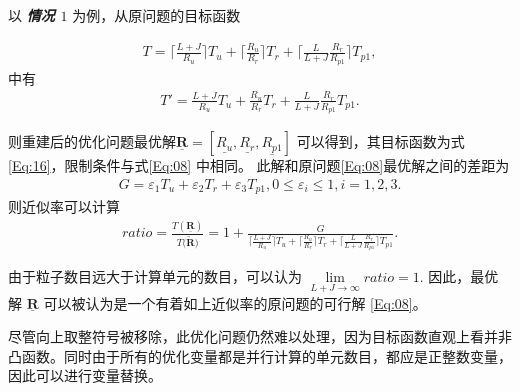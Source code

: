 以 \emph{\textbf{情况 $1$}} 为例，从原问题的目标函数

\begin{equation}\label{Eq:17}
\begin{split}
T=\lceil\frac{L+J}{R_{u}}\rceil T_{u}+\lceil\frac{R_{u}}{R_{r}}\rceil T_{r}+\lceil\frac{L}{L+J}\frac{R_r}{R_{p1}}\rceil T_{p1},
\end{split}
\end{equation}
中有
\begin{equation}\label{Eq:16}
\begin{split}
T'=\frac{L+J}{R_{u}} T_{u}+\frac{R_{u}}{R_{r}} T_{r}+\frac{L}{L+J}\frac{R_r}{R_{p1}} T_{p1}.
\end{split}
\end{equation}

则重建后的优化问题最优解$\mathbf{\underline{R}}=[\underline {R_{u}},\underline {R_{r}},\underline {R_{p1}}]$ 可以得到，其目标函数为式\eqref{Eq:16}，限制条件与式\eqref{Eq:08} 中相同。 此解和原问题\eqref{Eq:08}最优解之间的差距为
\begin{equation}\label{Eq:155}
\begin{split}
G = \varepsilon_1T_u+\varepsilon_2T_r+\varepsilon_3T_{p1}, 0\leq \varepsilon_i \leq 1, i=1,2,3.
\end{split}
\end{equation}
则近似率可以计算
\begin{equation}
\begin{split}
ratio = \frac{T(\mathbf{\underline{R}})}{T(\mathbf{\tilde {R})}} = 1+\frac{G}{\lceil\frac{L+J}{R_{u}}\rceil T_{u}+\lceil\frac{R_{u}}{R_{r}}\rceil T_{r}+\lceil\frac{L}{L+J}\frac{R_r}{R_{p1}}\rceil T_{p1}}.
\end{split}
\end{equation}


由于粒子数目远大于计算单元的数目，可以认为 $\lim\limits_{L+J \to \infty}{ratio} = 1$. 因此，最优解 $\mathbf{\underline{R}}$ 可以被认为是一个有着如上近似率的原问题的可行解 \eqref{Eq:08}。

尽管向上取整符号被移除，此优化问题仍然难以处理，因为目标函数直观上看并非凸函数。同时由于所有的优化变量都是并行计算的单元数目，都应是正整数变量，因此可以进行变量替换。

